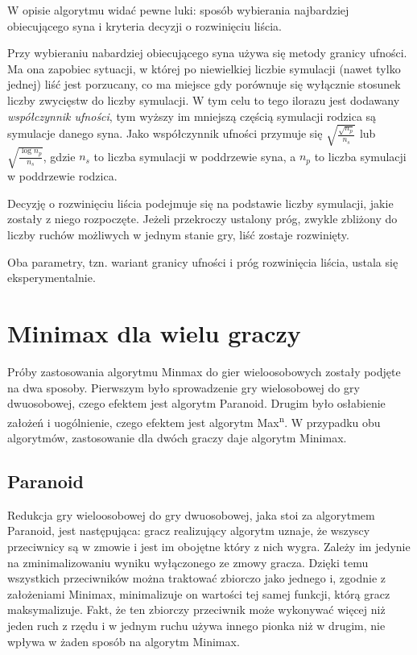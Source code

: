 \documentclass{pracamgr}
\begin{document}
W opisie algorytmu widać pewne luki: sposób wybierania najbardziej obiecującego syna i kryteria decyzji o rozwinięciu liścia.

Przy wybieraniu nabardziej obiecującego syna używa się metody granicy ufności.
Ma ona zapobiec sytuacji, w której po niewielkiej liczbie symulacji (nawet tylko jednej) liść jest porzucany, co ma miejsce gdy porównuje się wyłącznie stosunek liczby zwycięstw do liczby symulacji.
W tym celu to tego ilorazu jest dodawany \emph{współczynnik ufności}, tym wyższy im mniejszą częścią symulacji rodzica są symulacje danego syna. Jako współczynnik ufności przymuje się \(\sqrt{\frac{\sqrt{n_p}}{n_s}}\) lub \(\sqrt{\frac{\log{n_p}}{n_s}}\), gdzie \(n_s\) to liczba symulacji w poddrzewie syna, a \(n_p\) to liczba symulacji w poddrzewie rodzica.

Decyzję o rozwinięciu liścia podejmuje się na podstawie liczby symulacji, jakie zostały z niego rozpoczęte. Jeżeli przekroczy ustalony próg, zwykle zbliżony do liczby ruchów możliwych w jednym stanie gry, liść zostaje rozwinięty.

Oba parametry, tzn. wariant granicy ufności i próg rozwinięcia liścia, ustala się eksperymentalnie.

\section{Minimax dla wielu graczy}

Próby zastosowania algorytmu Minmax do gier wieloosobowych zostały podjęte na dwa sposoby.
Pierwszym było sprowadzenie gry wielosobowej do gry dwuosobowej, czego efektem jest algorytm Paranoid.
Drugim było osłabienie założeń i uogólnienie, czego efektem jest algorytm Max\textsuperscript{n}.
W przypadku obu algorytmów, zastosowanie dla dwóch graczy daje algorytm Minimax.

\subsection{Paranoid}

Redukcja gry wieloosobowej do gry dwuosobowej, jaka stoi za algorytmem Paranoid, jest następująca: gracz realizujący algorytm uznaje, że wszyscy przeciwnicy są w zmowie i jest im obojętne który z nich wygra.
Zależy im jedynie na zminimalizowaniu wyniku wyłączonego ze zmowy gracza.
Dzięki temu wszystkich przeciwników można traktować zbiorczo jako jednego i, zgodnie z założeniami Minimax, minimalizuje on wartości tej samej funkcji, którą gracz maksymalizuje.
Fakt, że ten zbiorczy przeciwnik może wykonywać więcej niż jeden ruch z rzędu i w jednym ruchu używa innego pionka niż w drugim, nie wpływa w żaden sposób na algorytm Minimax.
\end{document}
